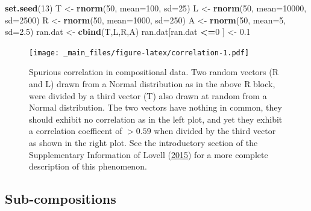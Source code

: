 \documentclass[onecolumn]{book}
\newenvironment{Shaded}{\begin{snugshade}}{\end{snugshade}}
\newcommand{\DataTypeTok}[1]{\textcolor[rgb]{0.13,0.29,0.53}{#1}}
\newcommand{\DecValTok}[1]{\textcolor[rgb]{0.00,0.00,0.81}{#1}}
\newcommand{\FloatTok}[1]{\textcolor[rgb]{0.00,0.00,0.81}{#1}}
\newcommand{\KeywordTok}[1]{\textcolor[rgb]{0.13,0.29,0.53}{\textbf{#1}}}
\newcommand{\NormalTok}[1]{#1}
\newcommand{\OperatorTok}[1]{\textcolor[rgb]{0.81,0.36,0.00}{\textbf{#1}}}
\newcommand{\StringTok}[1]{\textcolor[rgb]{0.31,0.60,0.02}{#1}}
\theoremstyle{definition}
\theoremstyle{definition}
\theoremstyle{definition}
\theoremstyle{remark}
\begin{document}
\begin{Shaded}
\begin{Highlighting}[]
\KeywordTok{set.seed}\NormalTok{(}\DecValTok{13}\NormalTok{)}
\NormalTok{T <-}\StringTok{ }\KeywordTok{rnorm}\NormalTok{(}\DecValTok{50}\NormalTok{, }\DataTypeTok{mean=}\DecValTok{100}\NormalTok{, }\DataTypeTok{sd=}\DecValTok{25}\NormalTok{)}
\NormalTok{L <-}\StringTok{ }\KeywordTok{rnorm}\NormalTok{(}\DecValTok{50}\NormalTok{, }\DataTypeTok{mean=}\DecValTok{10000}\NormalTok{, }\DataTypeTok{sd=}\DecValTok{2500}\NormalTok{)}
\NormalTok{R <-}\StringTok{ }\KeywordTok{rnorm}\NormalTok{(}\DecValTok{50}\NormalTok{, }\DataTypeTok{mean=}\DecValTok{1000}\NormalTok{, }\DataTypeTok{sd=}\DecValTok{250}\NormalTok{)}
\NormalTok{A <-}\StringTok{ }\KeywordTok{rnorm}\NormalTok{(}\DecValTok{50}\NormalTok{, }\DataTypeTok{mean=}\DecValTok{5}\NormalTok{, }\DataTypeTok{sd=}\FloatTok{2.5}\NormalTok{)}
\NormalTok{ran.dat <-}\StringTok{ }\KeywordTok{cbind}\NormalTok{(T,L,R,A)}
\NormalTok{ran.dat[ran.dat }\OperatorTok{<=}\DecValTok{0}\NormalTok{ ] <-}\StringTok{ }\FloatTok{0.1}
\end{Highlighting}
\end{Shaded}

\begin{figure}
\centering
\texttt{[image: \_main\_files/figure-latex/correlation-1.pdf]}
\caption{\label{fig:correlation}Spurious correlation in compositional data.
Two random vectors (R and L) drawn from a Normal distribution as in the
above R block, were divided by a third vector (T) also drawn at random
from a Normal distribution. The two vectors have nothing in common, they
should exhibit no correlation as in the left plot, and yet they exhibit
a correlation coefficent of \(>0.59\) when divided by the third vector
as shown in the right plot. See the introductory section of the
Supplementary Information of Lovell
(\protect\hyperlink{ref-Lovell:2015}{2015}) for a more complete
description of this phenomenon.}
\end{figure}

\hypertarget{sub-compositions}{%
\subsection{Sub-compositions}\label{sub-compositions}}
\end{document}
